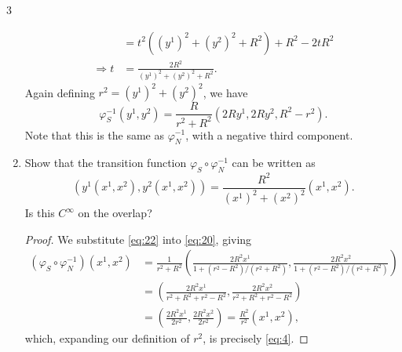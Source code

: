 \documentclass[11pt]{article}
\begin{document}
\begin{problem}{3}
\begin{enumerate}[label=(\alph*)]
\begin{answer}
\begin{equation}
\begin{aligned}
                    &= t^2\left( (y^1)^2 + (y^2)^2 + R^2 \right) + R^2 - 2tR^2 \\
                \Rightarrow t &= \frac{2R^2}{(y^1)^2 + (y^2)^2 + R^2}.
              \end{aligned}
            \end{equation}
            Again defining \( r^2 = (y^1)^2 + (y^2)^2 \), we have
            \begin{equation}
            \label{eq:p3d-inverse-south}
            \varphi_S^{-1}( y^1, y^2 ) = \frac{R}{r^2 + R^2} \left( 2Ry^1, 2R y^2, R^2 - r^2 \right).
          \end{equation}
          Note that this is the same as \( \varphi_N^{-1} \), with a negative third component.
        \end{answer}
		\item Show that the transition function \(\varphi_S \circ \varphi_N^{-1}\) can be written as
		      \begin{equation}
			      \label{eq:4}
			      ( y^1(x^1, x^2), y^2(x^1, x^2) ) = \frac{R^2}{(x^{1})^2 + (x^2)^2}(x^1, x^2).
		      \end{equation}
		      Is this \( C^{\infty} \) on the overlap?
          \begin{proof}
            We substitute \cref{eq:22} into \cref{eq:20}, giving
            \begin{equation}
            \label{eq:39}
            \begin{aligned}
              (\varphi_S \circ \varphi_N^{-1})(x^1, x^2) &= \frac{1}{r^2 + R^2} \left( \frac{2R^2 x^{1}}{1 + (r^2 - R^2)/(r^2 + R^2)}, \frac{2 R^2 x^2}{1 + (r^2 - R^2)/(r^2 + R^2)} \right) \\
                                         &= \left( \frac{2R^2 x^{1}}{r^2 + R^2 + r^2 - R^2}, \frac{2R^2 x^2}{r^2 + R^2 + r^2 - R^2} \right) \\
                                         &= \left( \frac{2R^2 x^{1}}{2r^2}, \frac{2R^2 x^2}{2r^2} \right) = \frac{R^2}{r^2}(x^1, x^2),
            \end{aligned}
          \end{equation}
          which, expanding our definition of \( r^2 \), is precisely \cref{eq:4}.


\end{proof}
\end{enumerate}
\end{problem}
\end{document}
